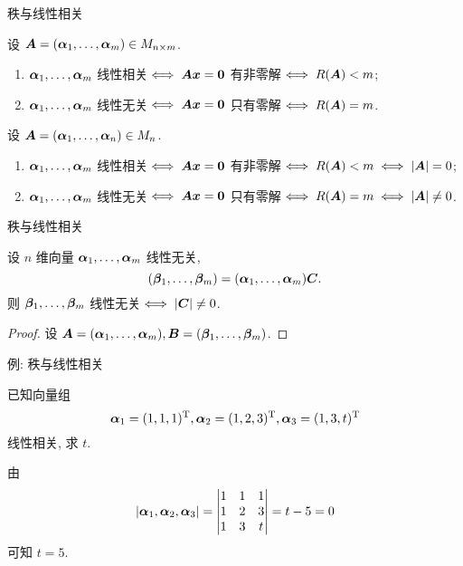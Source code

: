 \begin{frame}{秩与线性相关}
	\onslide<+->
	\begin{proposition}
		设 $\bfA=(\bma_1,\dots,\bma_m)\in M_{n\times m}$.
		\begin{enumerate}
			\item $\bma_1,\dots,\bma_m$ 线性相关$\iff \bfA\bfx={\bf0}$ 有非零解$\iff R(\bfA)<m$;
			\item $\bma_1,\dots,\bma_m$ 线性无关$\iff \bfA\bfx={\bf0}$ 只有零解$\iff R(\bfA)=m$.
		\end{enumerate}
	\end{proposition}
	\onslide<+->
	\begin{corollary}
		设 $\bfA=(\bma_1,\dots,\bma_n)\in M_n$.
		\begin{enumerate}
			\item $\bma_1,\dots,\bma_m$ 线性相关$\iff \bfA\bfx={\bf0}$ 有非零解$\iff R(\bfA)<m\iff |\bfA|=0$;
			\item $\bma_1,\dots,\bma_m$ 线性无关$\iff \bfA\bfx={\bf0}$ 只有零解$\iff R(\bfA)=m\iff |\bfA|\neq0$.
		\end{enumerate}
	\end{corollary}
\end{frame}


\begin{frame}{秩与线性相关}
	\onslide<+->
	\begin{proposition}
		设 $n$ 维向量 $\bma_1,\dots,\bma_m$ 线性无关, 
		\[(\bmb_1,\dots,\bmb_m)=(\bma_1,\dots,\bma_m)\bfC.\]
		则 $\bmb_1,\dots,\bmb_m$ 线性无关$\iff |\bfC|\neq0$.
	\end{proposition}
	\onslide<+->
	\begin{proof}
		设 $\bfA=(\bma_1,\dots,\bma_m),\bfB=(\bmb_1,\dots,\bmb_m)$.
		\onslide<+->{%
		于是命题得证.
		}
	\end{proof}
\end{frame}


\begin{frame}{例: 秩与线性相关}
	\onslide<+->
	\begin{example}
		已知向量组
		\[\bma_1=(1,1,1)^\rmT,\bma_2=(1,2,3)^\rmT,\bma_3=(1,3,t)^\rmT\]
		线性相关, 求 $t$.
	\end{example}
	\onslide<+->
	\begin{solution}
		由
		\[|\bma_1,\bma_2,\bma_3|=\begin{vmatrix}
			1&1&1\\
			1&2&3\\
			1&3&t
		\end{vmatrix}=t-5=0\]
		可知 $t=5$.
	\end{solution}
\end{frame}


